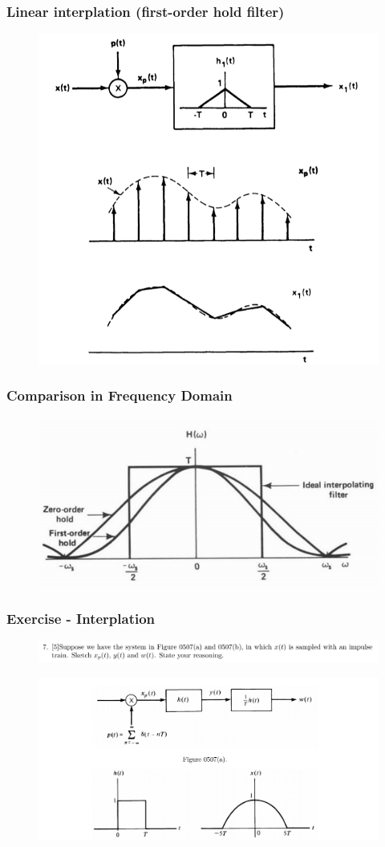 \documentclass{beamer}
\begin{document}
\begin{frame}
\frametitle{Linear interplation (first-order hold filter)}
\begin{figure}
\includegraphics[width=0.7\linewidth]{sample7}
\end{figure}
\end{frame}

\begin{frame}
\frametitle{Comparison in Frequency Domain}
\begin{figure}
\includegraphics[width=0.7\linewidth]{sample8}
\end{figure}
\end{frame}

\begin{frame}
    \frametitle{Exercise - Interplation}
    \begin{figure}
        \includegraphics[width=1\linewidth]{q7a}
    \end{figure}
    \begin{figure}
        \includegraphics[width=0.8\linewidth]{q7b}
    \end{figure}

\bigskip
\bigskip
\bigskip
\bigskip
\bigskip
\end{frame}
\end{document}
